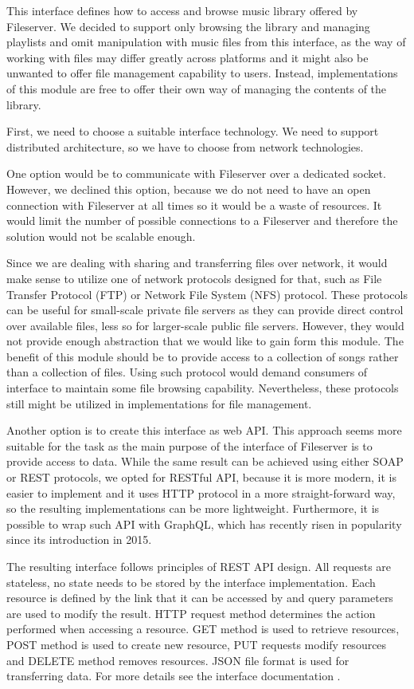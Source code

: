 This interface defines how to access and browse music library offered by Fileserver. We decided to support only browsing the library and managing playlists and omit manipulation with music files from this interface, as the way of working with files may differ greatly across platforms and it might also be unwanted to offer file management capability to users. Instead, implementations of this module are free to offer their own way of managing the contents of the library.
\par
First, we need to choose a suitable interface technology. We need to support distributed architecture, so we have to choose from network technologies.
\par
One option would be to communicate with Fileserver over a dedicated socket. However, we declined this option, because we do not need to have an open connection with Fileserver at all times so it would be a waste of resources. It would limit the number of possible connections to a Fileserver and therefore the solution would not be scalable enough.
\par
Since we are dealing with sharing and transferring files over network, it would make sense to utilize one of network protocols designed for that, such as File Transfer Protocol (FTP) or Network File System (NFS) protocol. These protocols can be useful for small-scale private file servers as they can provide direct control over available files, less so for larger-scale public file servers. However, they would not provide enough abstraction that we would like to gain form this module. The benefit of this module should be to provide access to a collection of songs rather than a collection of files. Using such protocol would demand consumers of interface to maintain some file browsing capability. Nevertheless, these protocols still might be utilized in implementations for file management.
\par
Another option is to create this interface as web API. This approach seems more suitable for the task as the main purpose of the interface of Fileserver is to provide access to data. While the same result can be achieved using either SOAP or REST protocols, we opted for RESTful API, because it is more modern, it is easier to implement and it uses HTTP protocol in a more straight-forward way, so the resulting implementations can be more lightweight. Furthermore, it is possible to wrap such API with GraphQL, which has recently risen in popularity since its introduction in 2015.
\par
The resulting interface follows principles of REST API design. All requests are stateless, no state needs to be stored by the interface implementation. Each resource is defined by the link that it can be accessed by and query parameters are used to modify the result. HTTP request method determines the action performed when accessing a resource. GET method is used to retrieve resources, POST method is used to create new resource, PUT requests modify resources and DELETE method removes resources. JSON file format is used for transferring data. For more details see the interface documentation .

